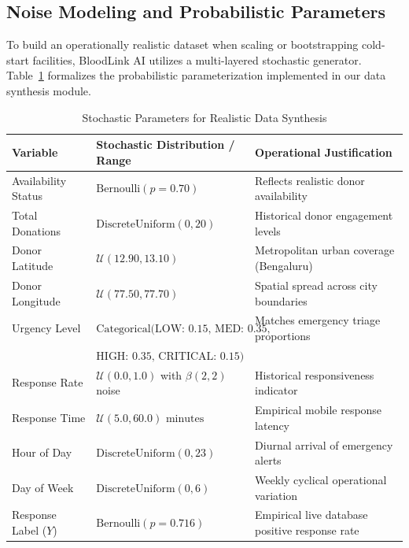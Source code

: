 \documentclass[conference]{IEEEtran}
\begin{document}
\subsection{Noise Modeling and Probabilistic Parameters}
To build an operationally realistic dataset when scaling or bootstrapping cold-start facilities, BloodLink AI utilizes a multi-layered stochastic generator. Table~\ref{tab:noise_parameters} formalizes the probabilistic parameterization implemented in our data synthesis module.

\begin{table}[H]
\caption{Stochastic Parameters for Realistic Data Synthesis}
\label{tab:noise_parameters}
\centering
\begin{tabular}{lll}
\toprule
\textbf{Variable} & \textbf{Stochastic Distribution / Range} & \textbf{Operational Justification} \\
\midrule
Availability Status & $\text{Bernoulli}(p = 0.70)$ & Reflects realistic donor availability \\
Total Donations & $\text{DiscreteUniform}(0, 20)$ & Historical donor engagement levels \\
Donor Latitude & $\mathcal{U}(12.90, 13.10)$ & Metropolitan urban coverage (Bengaluru) \\
Donor Longitude & $\mathcal{U}(77.50, 77.70)$ & Spatial spread across city boundaries \\
Urgency Level & $\text{Categorical}(\text{LOW: 0.15, MED: 0.35,}$ & Matches emergency triage proportions \\
              & $\text{HIGH: 0.35, CRITICAL: 0.15})$ & \\
Response Rate & $\mathcal{U}(0.0, 1.0)$ with $\beta(2, 2)$ noise & Historical responsiveness indicator \\
Response Time & $\mathcal{U}(5.0, 60.0)\text{ minutes}$ & Empirical mobile response latency \\
Hour of Day & $\text{DiscreteUniform}(0, 23)$ & Diurnal arrival of emergency alerts \\
Day of Week & $\text{DiscreteUniform}(0, 6)$ & Weekly cyclical operational variation \\
Response Label ($Y$) & $\text{Bernoulli}(p = 0.716)$ & Empirical live database positive response rate \\
\bottomrule
\end{tabular}
\end{table}
\end{document}
